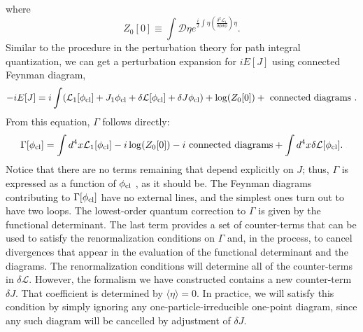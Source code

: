 where
\[Z_0[0] \equiv \int \mathcal{D}\eta e^{ \frac{i}{2}\int \eta \left( \frac{\delta^2 \mathcal{L}_1}{\delta \phi \delta \phi}\right) \eta }.\]
Similar to the procedure in the perturbation theory for path integral quantization, we can get a perturbation expansion for $iE[J]$ using connected Feynman diagram,
\[-iE[J] = i \int ( \mathcal{L}_1 [\phi_{\rm cl}] + J_1\phi_{\rm cl} + \delta \mathcal{L}[\phi_{\rm cl}] + \delta J \phi_{\rm cl} ) + \log(Z_0[0]) + \mbox{ connected diagrams }.\]
From this equation, $\Gamma$ follows directly:
\[\Gamma[\phi_{\rm cl}] = \int d^4x \mathcal{L}_1[\phi_{\rm cl}] -i\log(Z_0[0]) -i \mbox{ connected diagrams} + \int d^4x \delta\mathcal{L}[\phi_{\rm cl}].\]
Notice that there are no terms remaining that depend explicitly on $J$; thus, $\Gamma$ is expressed as a function of $\phi_{\rm cl}$ , as it should be. The Feynman diagrams contributing to $\Gamma[\phi_{\rm cl}]$ have no external lines, and the simplest ones turn out to have two loops. The lowest-order quantum correction to $\Gamma$ is given by the
functional determinant.
The last term provides a set of counter-terms that can be used to satisfy the renormalization conditions on $\Gamma$ and, in the process, to cancel divergences that appear in the evaluation of the functional determinant and the diagrams. 
The renormalization conditions will determine all of the counter-terms in $\delta \mathcal{L}$. However, the formalism we have constructed contains a new counter-term $\delta J$. That coefficient is determined by  $\langle \eta \rangle = 0$. In practice, we will satisfy this condition by simply ignoring any one-particle-irreducible one-point diagram, since any such diagram will be cancelled by adjustment of $\delta J$.

